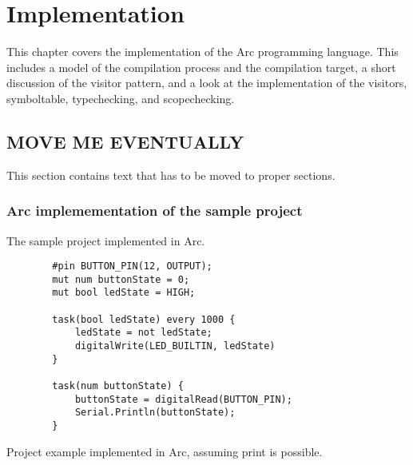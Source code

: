 \chapter{Implementation}\label{cha:implementation}
This chapter covers the implementation of the Arc programming language. This includes a model of the compilation process and the compilation target, a short discussion of the visitor pattern, and a look at the implementation of the visitors, symboltable, typechecking, and scopechecking.










\section{MOVE ME EVENTUALLY}
This section contains text that has to be moved to proper sections.

\subsection*{Arc implemementation of the sample project}
The sample project implemented in Arc.

\begin{listing}[htb!]
    \begin{verbatim}
        #pin BUTTON_PIN(12, OUTPUT);
        mut num buttonState = 0;
        mut bool ledState = HIGH;

        task(bool ledState) every 1000 {
            ledState = not ledState;
            digitalWrite(LED_BUILTIN, ledState)
        }

        task(num buttonState) {
            buttonState = digitalRead(BUTTON_PIN);
            Serial.Println(buttonState);
        }
    \end{verbatim}
    \caption{Project example implemented in Arc, assuming print is possible.}
    \label{lst:arcexample}
\end{listing}
